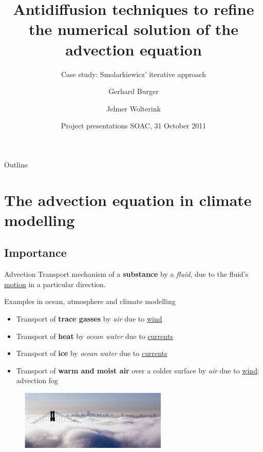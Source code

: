 \documentclass[hyperref={pdfstartview=Fit}]{beamer}
\title[Advection equation and antidiffusion]%
{Antidiffusion techniques to refine the numerical solution of the advection equation}
\subtitle{Case study: Smolarkiewicz' iterative approach}
\author[Burger, Wolterink]%
{Gerhard Burger \and Jelmer Wolterink}
\institute[Utrecht University]%
{
  Scientific Computing\\
  Department of Mathematics\\
  Utrecht University
}
\date[31-Oct-2011] %
{Project presentations SOAC, 31 October 2011}
\begin{document}
\begin{frame}
  \titlepage
\end{frame}

\begin{frame}{Outline}
  \tableofcontents
\end{frame}

\section{The advection equation in climate modelling}
\subsection{Importance}

\begin{frame}

\begin{block}{Advection}
Transport mechanism of a \textbf{substance} by a \textit{fluid}, due to the fluid's \underline{motion} in a particular direction.
\end{block}

Examples in ocean, atmosphere and climate modelling

\begin{itemize}
   \item Transport of \textbf{trace gasses} by \textit{air} due to \underline{wind}
   \item Transport of \textbf{heat} by \textit{ocean water} due to \underline{currents}
   \item Transport of \textbf{ice} by \textit{ocean water} due to \underline{currents}
   \item Transport of \textbf{warm and moist air} over a colder surface by \textit{air} due to \underline{wind}: advection fog
\end{itemize}

\begin{figure}
\includegraphics[width=7cm]{advfog.png}
\end{figure}

\end{frame}
\end{document}
